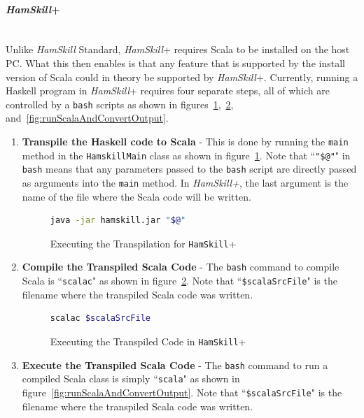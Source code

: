 \documentclass{report}
\newcommand{\myparagraph}[1]{\paragraph{#1}\mbox{}\\}
\begin{document}
\myparagraph{\textit{HamSkill}+}

Unlike \textit{HamSkill} Standard, \textit{HamSkill}+ requires Scala to be installed on the host PC.  What this then enables is that any feature that is supported by the install version of Scala could in theory be supported by \textit{HamSkill}+.  Currently, running a Haskell program in \textit{HamSkill}+ requires four separate steps, all of which are controlled by a \texttt{bash} scripts as shown in figures~\ref{fig:runHamskill},~\ref{fig:compileScala}, and~\ref{fig:runScalaAndConvertOutput}.

\begin{enumerate}

\item \textbf{Transpile the Haskell code to Scala} - This is done by running the \texttt{main} method in the \texttt{HamskillMain} class as shown in figure~\ref{fig:runHamskill}.  Note that ``\texttt{"\$@"}" in \texttt{bash} means that any parameters passed to the \texttt{bash} script are directly passed as arguments into the \texttt{main} method.  In \textit{HamSkill+}, the last argument is the name of the file where the Scala code will be written.

\begin{figure}[H]
\begin{mdframed}
\begin{lstlisting}[language=bash]
java -jar hamskill.jar "$@"
\end{lstlisting}
\end{mdframed}
\caption{Executing the Transpilation for \texttt{HamSkill}+}\label{fig:runHamskill}
\end{figure}

\item \textbf{Compile the Transpiled Scala Code} - The \texttt{bash} command to compile Scala is ``\texttt{scalac}" as shown in figure~\ref{fig:compileScala}.  Note that ``\texttt{\$scalaSrcFile}" is the filename where the transpiled Scala code was written.

\begin{figure}[H]
\begin{mdframed}
\begin{lstlisting}[language=bash]
scalac $scalaSrcFile
\end{lstlisting}
\end{mdframed}
\caption{Executing the Transpiled Code in \texttt{HamSkill}+}\label{fig:compileScala}
\end{figure}

\item \textbf{Execute the Transpiled Scala Code} - The \texttt{bash} command to run a compiled Scala class is simply ``\texttt{scala}" as shown in figure~\ref{fig:runScalaAndConvertOutput}.  Note that ``\texttt{\$scalaSrcFile}" is the filename where the transpiled Scala code was written.


\end{enumerate}
\end{document}
